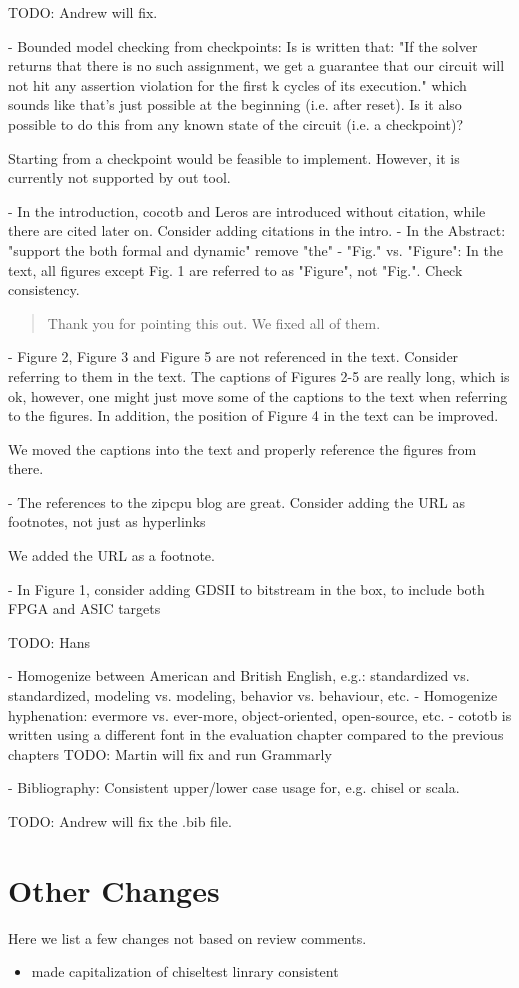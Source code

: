 \documentclass{article}
\newcommand{\todo}[1]{{\color{olive} TODO: #1}}
\newcommand{\reply}[1]{{\color{blue} #1}}
\begin{document}
\todo{Andrew will fix.}

- Bounded model checking from checkpoints: Is is written that: "If the solver returns that there is no such assignment, we get a guarantee that our circuit will not hit any assertion violation for the first k cycles of its execution." which sounds like that's just possible at the beginning (i.e. after reset). Is it also possible to do this from any known state of the circuit (i.e. a checkpoint)?

\reply{
Starting from a checkpoint would be feasible to implement. However, it is currently not supported by out tool.
}

- In the introduction, cocotb and Leros are introduced without citation, while there are cited later on. Consider adding citations in the intro.
- In the Abstract: "support the both formal and dynamic" remove "the"
- "Fig." vs. "Figure": In the text, all figures except Fig. 1 are referred to as "Figure", not "Fig.". Check consistency.

\begin{quote}
\reply{Thank you for pointing this out. We fixed all of them.}
\end{quote}

- Figure 2, Figure 3 and Figure 5 are not referenced in the text. Consider referring to them in the text. The captions of Figures 2-5 are really long, which is ok, however, one might just move some of the captions to the text when referring to the figures. In addition, the position of Figure 4 in the text can be improved. 

\reply{
We moved the captions into the text and properly reference the figures from there.
}

- The references to the zipcpu blog are great. Consider adding the URL as footnotes, not just as hyperlinks

\reply{
We added the URL as a footnote.
}

- In Figure 1, consider adding GDSII to bitstream in the box, to include both FPGA and ASIC targets

\todo{Hans}

- Homogenize between American and British English, e.g.: standardized vs. standardized, modeling vs. modeling, behavior vs. behaviour, etc.
- Homogenize hyphenation: evermore vs. ever-more, object-oriented, open-source, etc.
- cototb is written using a different font in the evaluation chapter compared to the previous chapters
\todo{Martin will fix and run Grammarly}

- Bibliography: Consistent upper/lower case usage for, e.g. chisel or scala.

\todo{Andrew will fix the .bib file.}




\section*{Other Changes}

Here we list a few changes not based on review comments.

\begin{itemize}
	\item  made capitalization of chiseltest linrary consistent
\end{itemize}
\end{document}
